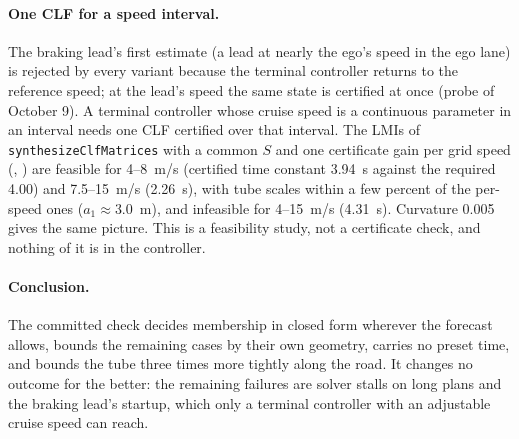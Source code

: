 \documentclass[11pt]{article}
\begin{document}
\paragraph{One CLF for a speed interval.} The braking lead's first estimate
(a lead at nearly the ego's speed in the ego lane) is rejected by every
variant because the terminal controller returns to the reference speed; at
the lead's speed the same state is certified at once (probe of October 9).
A terminal controller whose cruise speed is a continuous parameter in an
interval needs one CLF certified over that interval. The LMIs of
\texttt{synthesizeClfMatrices} with a common $S$ and one certificate gain per
grid speed (,
) are feasible for 4--8~m/s (certified time
constant 3.94~s against the required 4.00) and 7.5--15~m/s (2.26~s), with
tube scales within a few percent of the per-speed ones ($a_1\approx3.0$~m),
and infeasible for 4--15~m/s (4.31~s). Curvature 0.005 gives the same
picture. This is a feasibility study, not a certificate check, and nothing
of it is in the controller.

\paragraph{Conclusion.} The committed check decides membership in closed
form wherever the forecast allows, bounds the remaining cases by their own
geometry, carries no preset time, and bounds the tube three times more
tightly along the road. It changes no outcome for the better: the remaining
failures are solver stalls on long plans and the braking lead's startup,
which only a terminal controller with an adjustable cruise speed can reach.
\end{document}
